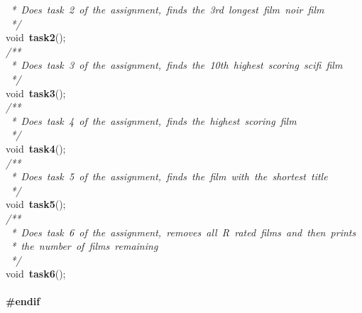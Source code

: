 \documentclass{article}
\begin{document}
\mbox{}\textit{\ *\ Does\ task\ 2\ of\ the\ assignment,\ finds\ the\ 3rd\ longest\ film\ noir\ film} \\
\mbox{}\textit{\ */} \\
\mbox{}void\ \textbf{task2}(); \\
\mbox{}\textit{/**} \\
\mbox{}\textit{\ *\ Does\ task\ 3\ of\ the\ assignment,\ finds\ the\ 10th\ highest\ scoring\ scifi\ film} \\
\mbox{}\textit{\ */} \\
\mbox{}void\ \textbf{task3}(); \\
\mbox{}\textit{/**} \\
\mbox{}\textit{\ *\ Does\ task\ 4\ of\ the\ assignment,\ finds\ the\ highest\ scoring\ film} \\
\mbox{}\textit{\ */} \\
\mbox{}void\ \textbf{task4}(); \\
\mbox{}\textit{/**} \\
\mbox{}\textit{\ *\ Does\ task\ 5\ of\ the\ assignment,\ finds\ the\ film\ with\ the\ shortest\ title} \\
\mbox{}\textit{\ */} \\
\mbox{}void\ \textbf{task5}(); \\
\mbox{}\textit{/**} \\
\mbox{}\textit{\ *\ Does\ task\ 6\ of\ the\ assignment,\ removes\ all\ R\ rated\ films\ and\ then\ prints} \\
\mbox{}\textit{\ *\ the\ number\ of\ films\ remaining} \\
\mbox{}\textit{\ */} \\
\mbox{}void\ \textbf{task6}(); \\
\mbox{} \\
\mbox{}\textbf{\#endif} \\
\mbox{}
\end{document}
